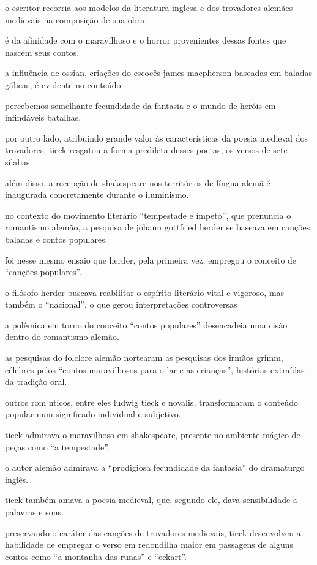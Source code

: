 o escritor recorria aos modelos da literatura inglesa e dos trovadores alemães medievais na composição de sua obra. 

é da afinidade com o maravilhoso e o horror provenientes dessas fontes que nascem seus contos.

a influência de ossian, criações do escocês james macpherson baseadas em baladas gálicas, é evidente no conteúdo.

percebemos semelhante fecundidade da fantasia e o mundo de heróis em infindáveis batalhas.

por outro lado, atribuindo grande valor às características da poesia medieval dos trovadores, tieck resgatou a forma predileta desses poetas, os versos de sete sílabas 

além disso, a recepção de shakespeare nos territórios de língua alemã é inaugurada concretamente durante o iluminismo.

no contexto do movimento literário “tempestade e ímpeto”, que prenuncia o romantismo alemão, a pesquisa de johann    gottfried herder se baseava em canções, baladas e contos populares. 

foi nesse mesmo ensaio que herder, pela primeira vez, empregou o conceito de “canções populares”. 

o filósofo herder buscava reabilitar o espírito literário vital e vigoroso, mas também o “nacional”, o que gerou interpretações controversas 

a polêmica em torno do conceito “contos populares” desencadeia uma cisão dentro do romantismo alemão. 

as pesquisas do folclore alemão nortearam as pesquisas dos irmãos grimm, célebres pelos “contos maravilhosos para o lar e as crianças”, histórias extraídas da tradição oral. 

outros rom nticos, entre eles ludwig tieck e novalis, transformaram o conteúdo popular num significado individual e subjetivo. 

tieck admirava o maravilhoso em shakespeare, presente no ambiente mágico de peças como “a tempestade”.

o autor alemão admirava a “prodigiosa fecundidade da fantasia” do dramaturgo inglês.

tieck também amava a poesia medieval, que, segundo ele, dava sensibilidade a palavras e sons. 

preservando o caráter das canções de trovadores medievais, tieck desenvolveu a habilidade de empregar o verso em redondilha maior em passagens de alguns contos como “a montanha das runas” e “eckart”. 


